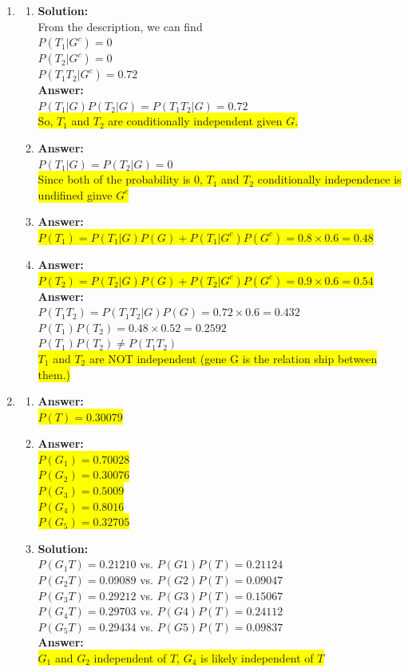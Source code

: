\documentclass{article}
\newcommand{\myansw}{\textbf{Answer:}\\}
\newcommand{\mysolu}{\textbf{Solution:}\\}
\begin{document}
\begin{enumerate}
\begin{enumerate}
	\end{enumerate}
	\item
	\begin{enumerate}
		\item
		\mysolu
		From the description, we can find\\
		${P(T_1|G^c) = 0}$\\
		${P(T_2|G^c) = 0}$\\
		${P(T_1 T_2|G^c) = 0.72}$\\
		\myansw
		${P(T_1|G)P(T_2|G)=P(T_1 T_2|G)=0.72}$\\
		\colorbox{yellow}{So, ${T_1}$ and ${T_2}$ are conditionally independent given ${G}$.}\\
		\item
		\myansw
		${P(T_1|G)=P(T_2|G) = 0}$\\
		\colorbox{yellow}{Since both of the probability is 0, ${T_1}$ and ${T_2}$ conditionally independence is undifined ginve ${G^c}$}\\
		\item
		\myansw
		\colorbox{yellow}{${P(T_1)= P(T_1|G)P(G)+P(T_1|G^c)P(G^c) = 0.8\times 0.6 = 0.48}$}\\
		\item
		\myansw
		\colorbox{yellow}{${P(T_2)= P(T_2|G)P(G)+P(T_2|G^c)P(G^c) = 0.9\times 0.6 = 0.54}$}\\
		\myansw
		${P(T_1 T_2)= P(T_1 T_2|G)P(G)=0.72\times 0.6 = 0.432}$\\
		${P(T_1)P(T_2)=0.48\times 0.52 = 0.2592}$\\
		${P(T_1)P(T_2) \neq P(T_1 T_2)}$\\
		\colorbox{yellow}{${T_1}$ and ${T_2}$ are NOT independent (gene G is the relation ship between them.)}\\
	\end{enumerate}
	\item
	\begin{enumerate}
		\item
		\myansw
		\colorbox{yellow}{${P(T) = 0.30079}$}\\
		\item
		\myansw
		\colorbox{yellow}{${P(G_1) = 0.70028}$}\\
		\colorbox{yellow}{${P(G_2) = 0.30076}$}\\
		\colorbox{yellow}{${P(G_3) = 0.5009}$}\\
		\colorbox{yellow}{${P(G_4) = 0.8016}$}\\
		\colorbox{yellow}{${P(G_5) = 0.32705}$}\\
		\item
		\mysolu
		${P(G_1T) = 0.21210 }$ vs. ${P(G1)P(T) = 0.21124}$\\
		${P(G_2T) = 0.09089}$ vs. ${P(G2)P(T) = 0.09047}$\\
		${P(G_3T) = 0.29212}$ vs. ${P(G3)P(T) = 0.15067}$\\
		${P(G_4T) = 0.29703}$ vs. ${P(G4)P(T) = 0.24112}$\\
		${P(G_5T) = 0.29434}$ vs. ${P(G5)P(T) = 0.09837}$\\
		\myansw
		\colorbox{yellow}{${G_1}$ and ${G_2}$ independent of ${T}$, ${G_4}$ is likely independent of ${T}$}\\
		

\end{enumerate}
\end{enumerate}
\end{document}
